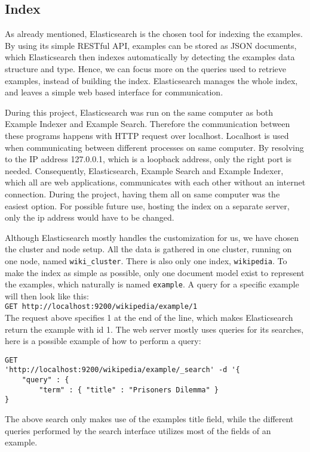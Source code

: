 \subsection{Index}
As already mentioned, Elasticsearch is the chosen tool for indexing the examples. By using its simple RESTful API, examples can be stored as JSON documents, which Elasticsearch then indexes automatically by detecting the examples data structure and type. Hence, we can focus more on the queries used to retrieve examples, instead of building the index. Elasticsearch manages the whole index, and leaves a simple web based interface for communication.

During this project, Elasticsearch was run on the same computer as both Example Indexer and Example Search. Therefore the communication between these programs happens with HTTP request over localhost. Localhost is used when communicating between different processes on same computer. By resolving to the IP address 127.0.0.1, which is a loopback address, only the right port is needed. Consequently, Elasticsearch, Example Search and Example Indexer, which all are web applications, communicates with each other without an internet connection. During the project, having them all on same computer was the easiest option. For possible future use, hosting the index on a separate server, only the ip address would have to be changed.

Although Elasticsearch mostly handles the customization for us, we have chosen the cluster and node setup. All the data is gathered in one cluster, running on one node, named \texttt{wiki\_cluster}. There is also only one index, \texttt{wikipedia}. To make the index as simple as possible, only one document model exist to represent the examples, which naturally is named \texttt{example}. A query for a specific example will then look like this:\\
\texttt{GET http://localhost:9200/wikipedia/example/1}\\
The request above specifies 1 at the end of the line, which makes Elasticsearch return the example with id 1.
The web server mostly uses queries for its searches, here is a possible example of how to perform a query:
\begin{Verbatim}[fontsize=\small]
GET 
'http://localhost:9200/wikipedia/example/_search' -d '{
    "query" : {
        "term" : { "title" : "Prisoners Dilemma" }
}
\end{Verbatim}
The above search only makes use of the examples title field, while the different queries performed by the search interface utilizes most of the fields of an example.


